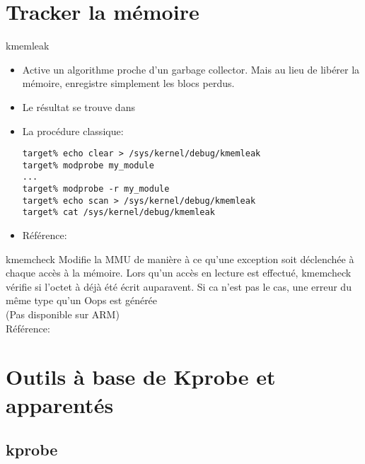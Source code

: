 \section{Tracker la mémoire}

\begin{frame}[fragile=singleslide]{kmemleak}
  \begin{itemize} 
  \item Active  un algorithme proche  d'un garbage collector.  Mais au
    lieu  de  libérer  la  mémoire, enregistre  simplement  les  blocs
    perdus.
  \item Le résultat se trouve dans 
  \item La procédure classique:
    \begin{lstlisting} 
target% echo clear > /sys/kernel/debug/kmemleak
target% modprobe my_module
...
target% modprobe -r my_module
target% echo scan > /sys/kernel/debug/kmemleak
target% cat /sys/kernel/debug/kmemleak
    \end{lstlisting} 
  \item Référence: 
  \end{itemize} 
\end{frame}

\begin{frame}[fragile=singleslide]{kmemcheck}
  Modifie la  MMU de manière à  ce qu'une exception  soit déclenchée à
  chaque accès à la mémoire. Lors qu'un accès en lecture est effectué,
  kmemcheck  vérifie si  l'octet à  déjà été  écrit auparavent.  Si ca
  n'est pas le cas, une erreur du même type qu'un Oops est générée
  \\[2ex]
  (Pas disponible sur ARM)
  \\[2ex]
  Référence: 
\end{frame} 

\section{Outils à base de Kprobe et apparentés}

\subsection{kprobe}

